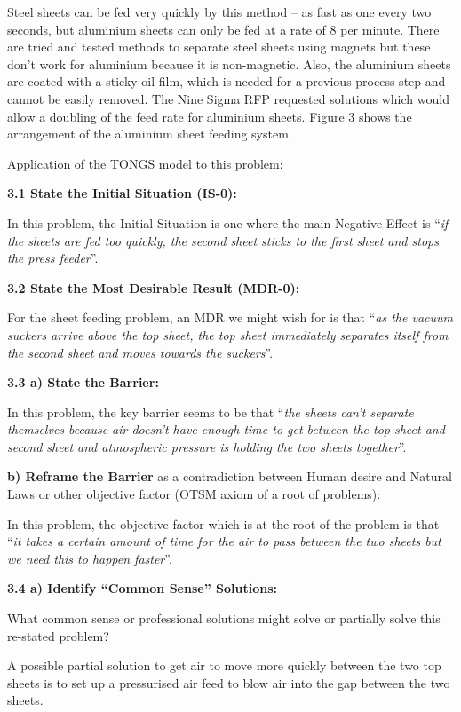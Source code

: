 \documentclass[11pt,a4paper]{article}
\begin{document}
Steel sheets can be fed very quickly by this method – as fast as one every two
seconds, but aluminium sheets can only be fed at a rate of 8 per minute. There
are tried and tested methods to separate steel sheets using magnets but these
don’t work for aluminium because it is non-magnetic.  Also, the aluminium
sheets are coated with a sticky oil film, which is needed for a previous
process step and cannot be easily removed.  The Nine Sigma RFP requested
solutions which would allow a doubling of the feed rate for aluminium sheets.
Figure 3 shows the arrangement of the aluminium sheet feeding system.

Application of the TONGS model to this problem:

\textbf{3.1  State the Initial Situation (IS-0):}

In this problem, the Initial Situation is one where the main Negative Effect
is “\emph{if the sheets are fed too quickly, the second sheet sticks to the
  first sheet and stops the press feeder}”.

\textbf{3.2 State the Most Desirable Result (MDR-0): }

For the sheet feeding problem, an MDR we might wish for is that “\emph{as the
  vacuum suckers arrive above the top sheet, the top sheet immediately
  separates itself from the second sheet and moves towards the suckers}”.

\textbf{3.3 a) State the Barrier:}

In this problem, the key barrier seems to be that “\emph{the sheets can’t
  separate themselves because air doesn’t have enough time to get between the
  top sheet and second sheet and atmospheric pressure is holding the two
  sheets together}”.

\textbf{b) Reframe the Barrier} as a contradiction between Human desire and
Natural Laws or other objective factor (OTSM axiom of a root of problems):

In this problem, the objective factor which is at the root of the problem is
that “\emph{it takes a certain amount of time for the air to pass between the
  two sheets but we need this to happen faster}”.

\textbf{3.4 a) Identify “Common Sense” Solutions:}

What common sense or professional solutions might solve or partially solve
this re-stated problem?

A possible partial solution to get air to move more quickly between the two
top sheets is to set up a pressurised air feed to blow air into the gap
between the two sheets.
\end{document}
